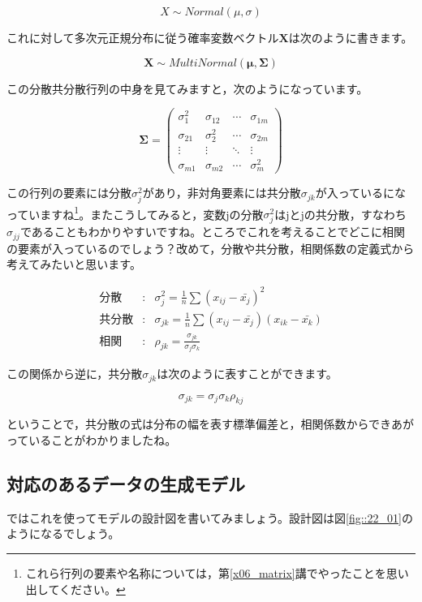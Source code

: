 \documentclass{ltjsbook}
\begin{document}
\[ X \sim Normal(\mu, \sigma) \]

これに対して多次元正規分布に従う確率変数ベクトル$\bm{X}$は次のように書きます。

\[ \bm{X} \sim MultiNormal(\bm{\mu}, \bm{\Sigma}) \]

この分散共分散行列の中身を見てみますと，次のようになっています。

\[ \bm{\Sigma} = \begin{pmatrix} \sigma_{1}^2 & \sigma_{12} & \cdots & \sigma_{1m}  \\
                \sigma_{21}  & \sigma_2^2  & \cdots & \sigma_{2m}  \\
                \vdots       & \vdots      & \ddots & \vdots       \\
                \sigma_{m1}  & \sigma_{m2} & \cdots & \sigma_{m}^2\end{pmatrix} \]

この行列の要素には分散$\sigma_j^2$があり，非対角要素には共分散$\sigma_{jk}$が入っているになっていますね\footnote{これら行列の要素や名称については，第\ref{x06_matrix}講でやったことを思い出してください。}。またこうしてみると，変数jの分散$\sigma_j^2$はjとjの共分散，すなわち$\sigma_{jj}$であることもわかりやすいですね。ところでこれを考えることでどこに相関の要素が入っているのでしょう？改めて，分散や共分散，相関係数の定義式から考えてみたいと思います。

\begin{eqnarray}
	\mbox{分散} &:& \sigma_{j}^2 = \frac{1}{n}\sum (x_{ij} -\bar{x_j})^2 \\
	\mbox{共分散} &:& \sigma_{jk} = \frac{1}{n}\sum (x_{ij} - \bar{x_j})(x_{ik} - \bar{x_k}) \\
	\mbox{相関} &:& \rho_{jk} = \frac{\sigma_{jk}}{\sigma_j\sigma_k}
\end{eqnarray}

この関係から逆に，共分散$\sigma_{jk}$は次のように表すことができます。

\[ \sigma_{jk} = \sigma_j \sigma_k \rho_{kj} \]

ということで，共分散の式は分布の幅を表す標準偏差と，相関係数からできあがっていることがわかりましたね。
\subsection{対応のあるデータの生成モデル}
ではこれを使ってモデルの設計図を書いてみましょう。設計図は図\ref{fig::22_01}のようになるでしょう。
\end{document}
